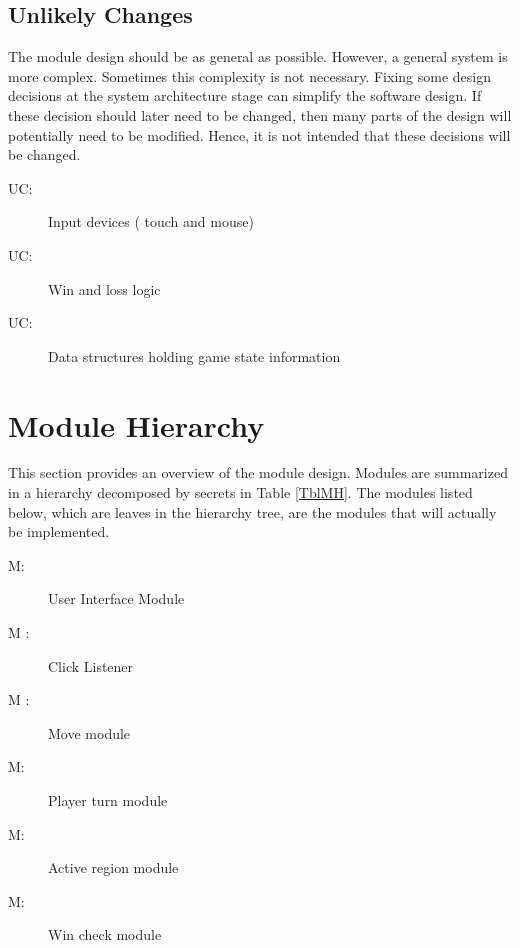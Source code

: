 \documentclass[12pt, titlepage]{article}
\newcounter{ucnum}
\newcommand{\uctheucnum}{UC\theucnum}
\newcounter{mnum}
\newcommand{\mthemnum}{M\themnum}
\begin{document}
\subsection{Unlikely Changes} \label{SecUchange}

The module design should be as general as possible. However, a general system is
more complex. Sometimes this complexity is not necessary. Fixing some design
decisions at the system architecture stage can simplify the software design. If
these decision should later need to be changed, then many parts of the design
will potentially need to be modified. Hence, it is not intended that these
decisions will be changed.

\begin{description}
\item[ \uctheucnum \label{uc1}:] Input devices ( touch and mouse)
\item[ \uctheucnum \label{uc2}:] Win and loss logic
\item[ \uctheucnum \label{uc3}:] Data structures holding game state information
\end{description}

\section{Module Hierarchy} \label{SecMH}

This section provides an overview of the module design. Modules are summarized
in a hierarchy decomposed by secrets in Table \ref{TblMH}. The modules listed
below, which are leaves in the hierarchy tree, are the modules that will
actually be implemented.

\begin{description}
\item [ \mthemnum \label{m1}:] User Interface Module
\item [ \mthemnum \label{m6} :] Click Listener
\item [ \mthemnum \label{m2} :] Move module
\item [ \mthemnum \label{m3}:] Player turn module
\item [ \mthemnum \label{m4}:] Active region module
\item [ \mthemnum \label{m5}:] Win check module
\end{description}
\end{document}
